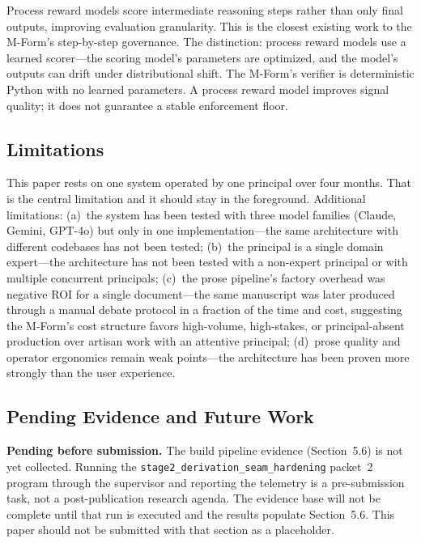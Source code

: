 \documentclass[11pt]{article}
\begin{document}
Process reward models \citep{lightman2023} score intermediate reasoning steps rather than only final outputs, improving evaluation granularity. This is the closest existing work to the M-Form's step-by-step governance. The distinction: process reward models use a learned scorer---the scoring model's parameters are optimized, and the model's outputs can drift under distributional shift. The M-Form's verifier is deterministic Python with no learned parameters. A process reward model improves signal quality; it does not guarantee a stable enforcement floor.

\subsection{Limitations}

This paper rests on one system operated by one principal over four months. That is the central limitation and it should stay in the foreground. Additional limitations: (a)~the system has been tested with three model families (Claude, Gemini, GPT-4o) but only in one implementation---the same architecture with different codebases has not been tested; (b)~the principal is a single domain expert---the architecture has not been tested with a non-expert principal or with multiple concurrent principals; (c)~the prose pipeline's factory overhead was negative ROI for a single document---the same manuscript was later produced through a manual debate protocol in a fraction of the time and cost, suggesting the M-Form's cost structure favors high-volume, high-stakes, or principal-absent production over artisan work with an attentive principal; (d)~prose quality and operator ergonomics remain weak points---the architecture has been proven more strongly than the user experience.

\subsection{Pending Evidence and Future Work}

\textbf{Pending before submission.} The build pipeline evidence (Section~5.6) is not yet collected. Running the \texttt{stage2\_derivation\_seam\_hardening} packet~2 program through the supervisor and reporting the telemetry is a pre-submission task, not a post-publication research agenda. The evidence base will not be complete until that run is executed and the results populate Section~5.6. This paper should not be submitted with that section as a placeholder.
\end{document}
